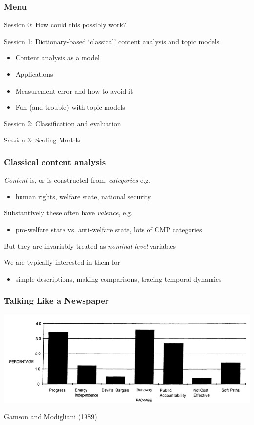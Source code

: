 \documentclass[11pt,compress,professionalfonts]{beamer}
\newcommand{\ita}{\begin{itemize}}
\newcommand{\itm}{\item[]}
\newcommand{\itz}{\end{itemize}}
\begin{document}
\begin{frame}[t]\frametitle{Menu}

Session 0: How could this possibly work?

Session 1: Dictionary-based `classical' content analysis and topic models
\ita
\itm Content analysis as a model
\itm Applications
\itm Measurement error and how to avoid it
\itm Fun (and trouble) with topic models
\itz

Session 2: Classification and evaluation

Session 3: Scaling Models


\end{frame}
\begin{frame}[t]\frametitle{Classical content analysis}

\textsl{Content} is, or is constructed from, \textsl{categories} e.g.
\ita
\itm human rights, welfare state, national security
\itz
Substantively these often have \textsl{valence}, e.g.
\ita
\itm pro-welfare state vs. anti-welfare state, lots of CMP categories
\itz
But they are invariably treated as \textsl{nominal level} variables

We are typically interested in them for
\ita
\itm simple descriptions, making comparisons, tracing temporal dynamics
\itz

\end{frame}
\begin{frame}[t]\frametitle{Talking Like a Newspaper}

\centerline{\includegraphics[scale=.8]{pictures/gamson-modigliani-frames-opinion}}
Gamson and Modigliani (1989)


\end{frame}
\end{document}
